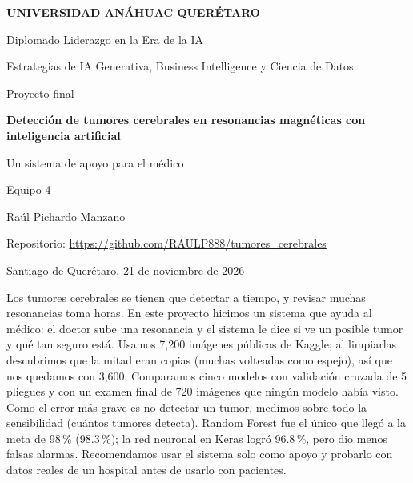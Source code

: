 \documentclass[10pt,letterpaper]{article}
\newcommand{\seccion}[1]{\par\vspace{3pt}{\small\bfseries #1}\par\vspace{0.5pt}}
\begin{document}
\begin{titlepage}
\centering
\vspace*{2cm}
{\Large\bfseries UNIVERSIDAD ANÁHUAC QUERÉTARO\par}
\vspace{0.6cm}
{\large Diplomado Liderazgo en la Era de la IA\par}
{\normalsize Estrategias de IA Generativa, Business Intelligence y Ciencia de Datos\par}
\vspace{3cm}
{\large Proyecto final\par}
\vspace{0.5cm}
{\LARGE\bfseries Detección de tumores cerebrales en resonancias magnéticas con inteligencia artificial\par}
\vspace{0.4cm}
{\large Un sistema de apoyo para el médico\par}
\vspace{3cm}
{\large Equipo 4\par}
\vspace{0.3cm}
{\large Raúl Pichardo Manzano\par}
\vfill
{\normalsize Repositorio: \url{https://github.com/RAULP888/tumores_cerebrales}\par}
\vspace{0.4cm}
{\normalsize Santiago de Querétaro, 21 de noviembre de 2026\par}
\end{titlepage}

\small

\seccion{Resumen}
Los tumores cerebrales se tienen que detectar a tiempo, y revisar muchas resonancias toma horas. En este proyecto hicimos un sistema que ayuda al médico: el doctor sube una resonancia y el sistema le dice si ve un posible tumor y qué tan seguro está. Usamos 7,200 imágenes públicas de Kaggle; al limpiarlas descubrimos que la mitad eran copias (muchas volteadas como espejo), así que nos quedamos con 3,600. Comparamos cinco modelos con validación cruzada de 5 pliegues y con un examen final de 720 imágenes que ningún modelo había visto. Como el error más grave es no detectar un tumor, medimos sobre todo la sensibilidad (cuántos tumores detecta). Random Forest fue el único que llegó a la meta de 98\,\% (98.3\,\%); la red neuronal en Keras logró 96.8\,\%, pero dio menos falsas alarmas. Recomendamos usar el sistema solo como apoyo y probarlo con datos reales de un hospital antes de usarlo con pacientes.
\end{document}
